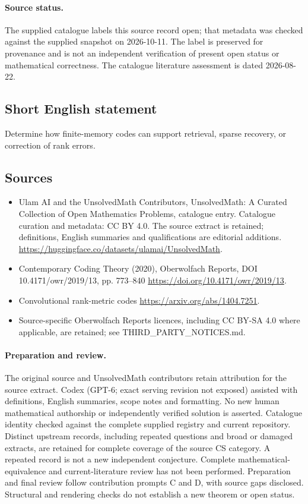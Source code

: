 \documentclass[11pt]{article}
\begin{document}
\paragraph{Source status.}
The supplied catalogue labels this source record open; that metadata was checked against the supplied snapshot on 2026-10-11. The label is preserved for provenance and is not an independent verification of present open status or mathematical correctness. The catalogue literature assessment is dated 2026-08-22.
\subsection{Short English statement}
Determine how finite-memory codes can support retrieval, sparse recovery, or correction of rank errors.
\subsection{Sources}
\begin{itemize}
\item[\hypertarget{source:statement:1}{S1}] Ulam AI and the UnsolvedMath Contributors, UnsolvedMath: A Curated Collection of Open Mathematics Problems, catalogue entry. Catalogue curation and metadata: CC BY 4.0. The source extract is retained; definitions, English summaries and qualifications are editorial additions.
\url{https://huggingface.co/datasets/ulamai/UnsolvedMath}.
\item[\hypertarget{source:statement:2}{S2}] Contemporary Coding Theory (2020), Oberwolfach Reports, DOI 10.4171/owr/2019/13, pp. 773--840
\url{https://doi.org/10.4171/owr/2019/13}.
\item[\hypertarget{source:statement:3}{S3}] Convolutional rank-metric codes
\url{https://arxiv.org/abs/1404.7251}.
\item Source-specific Oberwolfach Reports licences, including CC BY-SA 4.0 where applicable, are retained; see THIRD\_PARTY\_NOTICES.md.
\end{itemize}
\paragraph{Preparation and review.}
The original source and UnsolvedMath contributors retain attribution for the source extract. Codex (GPT-6; exact serving revision not exposed) assisted with definitions, English summaries, scope notes and formatting. No new human mathematical authorship or independently verified solution is asserted. Catalogue identity checked against the complete supplied registry and current repository. Distinct upstream records, including repeated questions and broad or damaged extracts, are retained for complete coverage of the source CS category. A repeated record is not a new independent conjecture. Complete mathematical-equivalence and current-literature review has not been performed. Preparation and final review follow contribution prompts C and D, with source gaps disclosed. Structural and rendering checks do not establish a new theorem or open status.
\label{end:statement}
\end{document}

